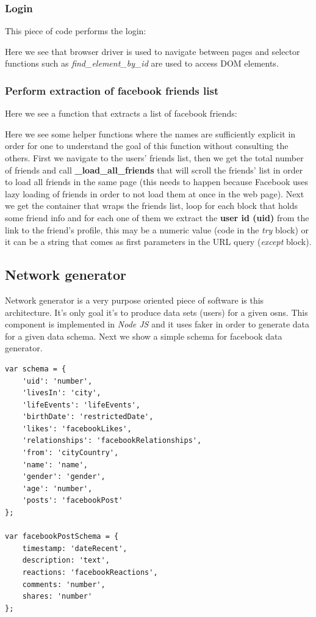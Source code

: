 \subsubsection*{Login}
This piece of code performs the login:



Here we see that browser driver is used to navigate between pages and selector functions such as \textit{find\_element\_by\_id} are used to access DOM elements.

\subsubsection*{Perform extraction of facebook friends list}
Here we see a function that extracts a list of facebook friends:



Here we see some helper functions where the names are sufficiently explicit in order for one to understand the goal of this function without consulting the others. First we navigate to the users' friends list, then we get the total number of friends and call \textbf{\_load\_all\_friends} that will scroll the friends' list in order to load all friends in the same page (this needs to happen because Facebook uses lazy loading of friends in order to not load them at once in the web page). Next we get the container that wraps the friends list, loop for each block that holds some friend info and for each one of them we extract the \textbf{user id (uid)} from the link to the friend's profile, this may be a numeric value (code in the \textit{try} block) or it can be a string that comes as first parameters in the URL query (\textit{except} block).

\subsection{Network generator}

Network generator is a very purpose oriented piece of software is this architecture. It's only goal it's to produce data sets (users) for a given \glspl{osn}. This component is implemented in \textit{Node JS} and it uses faker \cite{fakerjs} in order to generate data for a given data schema. Next we show a simple schema for facebook data generator.

\begin{verbatim}
var schema = {
    'uid': 'number',
    'livesIn': 'city',
    'lifeEvents': 'lifeEvents',
    'birthDate': 'restrictedDate',
    'likes': 'facebookLikes',
    'relationships': 'facebookRelationships',
    'from': 'cityCountry',
    'name': 'name',
    'gender': 'gender',
    'age': 'number',
    'posts': 'facebookPost'
};

var facebookPostSchema = {
    timestamp: 'dateRecent',
    description: 'text',
    reactions: 'facebookReactions',
    comments: 'number',
    shares: 'number'
};
\end{verbatim}

